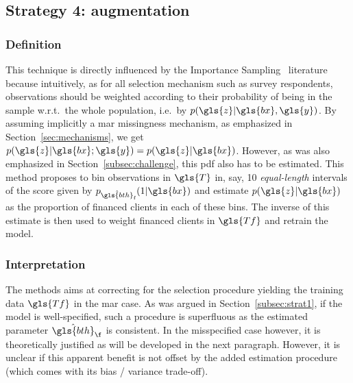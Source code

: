\subsection{Strategy 4: augmentation} \label{subsec:augmentation}

\subsubsection{Definition}
This technique is directly influenced by the Importance Sampling~\cite{zadrozny2004learning} literature because intuitively, as for all selection mechanism such as survey respondents, observations should be weighted according to their probability of being in the sample w.r.t.\ the whole population, i.e.\ by $p(\gls{z} | \gls{bx},\gls{y})$. By assuming implicitly a \gls{mar} missingness mechanism, as emphasized in Section~\ref{sec:mechanisms}, we get $p(\gls{z} | \gls{bx}; \gls{y}) = p(\gls{z} | \gls{bx})$. However, as was also emphasized in Section~\ref{subsec:challenge}, this \gls{pdf} also has to be estimated. This method proposes to bin observations in $\gls{T}$ in, say, 10 \textit{equal-length} intervals of the \gls{score} given by $p_{\hat{\gls{bth}}_\text{f}}(1 | \gls{bx})$ and estimate $p(\gls{z} | \gls{bx})$ as the proportion of financed clients in each of these bins. The inverse of this estimate is then used to weight financed clients in $\gls{Tf}$ and retrain the model.

\subsubsection{Interpretation}
The methods aims at correcting for the selection procedure yielding the training data $\gls{Tf}$ in the \gls{mar} case. As was argued in Section~\ref{subsec:strat1}, if the model is well-specified, such a procedure is superfluous as the estimated parameter $\hat{\gls{bth}}_{\f}$ is consistent. In the misspecified case however, it is theoretically justified as will be developed in the next paragraph. However, it is unclear if this apparent benefit is not offset by the added estimation procedure (which comes with its bias / variance trade-off).


